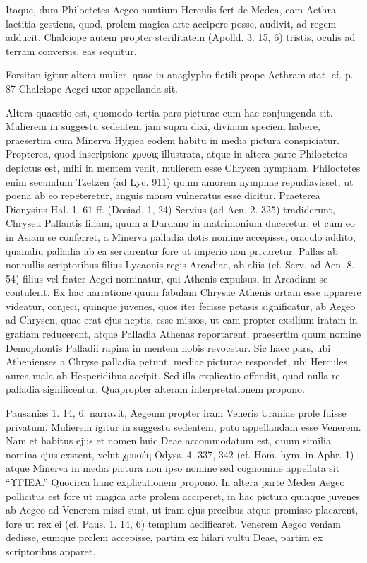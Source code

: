 \documentclass[a4paper, 11pt, oneside, polutonikogreek, german]{article}
\begin{document}
Itaque, dum Philoctetes Aegeo nuntium Herculis fert de Medea, eam Aethra laetitia gestiens, quod, prolem magica arte accipere posse, audivit, ad regem adducit. Chalciope autem propter sterilitatem (Apolld. 3. 15, 6) tristis, oculis ad terram conversis, eas sequitur.

Forsitan igitur altera mulier, quae in anaglypho fictili prope Aethram stat, cf. p. 87 Chalciope Aegei uxor appellanda sit.

Altera quaestio est, quomodo tertia pars picturae cum hac conjungenda sit. Mulierem in suggestu sedentem jam supra dixi, divinam speciem habere, praesertim cum Minerva Hygiea eodem habitu in media pictura conspiciatur. Propterea, quod inscriptione χρυσις illustrata, atque in altera parte Philoctetes depictus est, mihi in mentem venit, mulierem esse Chrysen nympham. Philoctetes enim secundum Tzetzen (ad Lyc. 911) quum amorem nymphae repudiavisset, ut poena ab eo repeteretur, anguis morsu vulneratus esse dicitur. Praeterea Dionysius Hal. 1. 61 ff. (Dosiad. 1, 24) Servius (ad Aen. 2. 325) tradiderunt, Chryseu Pallantis filiam, quum a Dardano in matrimonium duceretur, et cum eo in Asiam se conferret, a Minerva palladia dotis nomine accepisse, oraculo addito, quamdiu palladia ab ea servarentur fore ut imperio non privaretur. Pallas ab nonnullis scriptoribus filius Lycaonis regis Arcadiae, ab aliis (cf. Serv. ad Aen. 8. 54) filius vel frater Aegei nominatur, qui Athenis expulsus, in Arcadiam se contulerit. Ex hac narratione quum fabulam Chrysae Athenis ortam esse apparere videatur, conjeci, quinque juvenes, quos iter fecisse petasis significatur, ab Aegeo ad Chrysen, quae erat ejus neptis, esse missos, ut eam propter exsilium iratam in gratiam reducerent, atque Palladia Athenas reportarent, praesertim quum nomine Demophontis Palladii rapina in mentem nobis revocetur. Sic haec pars, ubi Athenienses a Chryse palladia petunt, mediae picturae respondet, ubi Hercules aurea mala ab Hesperidibus accipit. Sed illa explicatio offendit, quod nulla re palladia significentur. Quapropter alteram interpretationem propono.

Pausanias 1. 14, 6. narravit, Aegeum propter iram Veneris Uraniae prole fuisse privatum. Mulierem igitur in suggestu sedentem, puto appellandam esse Venerem. Nam et habitus ejus et nomen huic Deae accommodatum est, quum similia nomina ejus exstent, velut χρυσέη Odyss. 4. 337, 342 (cf. Hom. hym. in Aphr. 1) atque Minerva in media pictura non ipso nomine sed cognomine appellata sit "`ΥΓΙΕΑ."' Quocirca hanc explicationem propono. In altera parte Medea Aegeo pollicitus est fore ut magica arte prolem acciperet, in hac pictura quinque juvenes ab Aegeo ad Venerem missi sunt, ut iram ejus precibus atque promisso placarent, fore ut rex ei (cf. Paus. 1. 14, 6) templum aedificaret. Venerem Aegeo veniam dedisse, eumque prolem accepisse, partim ex hilari vultu Deae, partim ex scriptoribus apparet.
\clearpage
\end{document}
